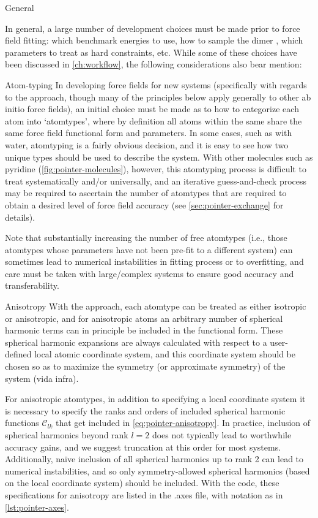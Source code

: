 \begin{subsection}{General}

In general, a large number of development choices must be made prior to force field
fitting: which benchmark energies to use, how to sample the dimer \pes, which
parameters to treat as hard constraints, etc. While some of these choices have
been discussed in \cref{ch:workflow}, the following considerations also bear
mention:

\begin{paragraph}{Atom-typing}
In developing force fields for new systems (specifically with regards to the \mastiff approach, though
many of the principles below apply generally to other ab initio force fields),
an initial choice must be made as to how to categorize each atom into 
`atomtypes', where by definition all atoms within the same \atomtype share the
same force field functional form and parameters. In some cases, such as with
water, atomtyping is a fairly obvious decision, and it is easy to see how two
unique types should be used to describe the system. With other molecules
such as pyridine (\cref{fig:pointer-molecules}), however, this
atomtyping process is difficult to treat systematically and/or universally, and an iterative
guess-and-check process may be required to ascertain the number of atomtypes
that are required to obtain a desired level of force field accuracy (see
\cref{sec:pointer-exchange} for details).

Note that substantially increasing the number of free atomtypes (i.e., those
atomtypes whose parameters have not been pre-fit to a different system) 
can sometimes lead to numerical instabilities in fitting process or to
overfitting,\cite{Hawkins2004} and care must be taken with large/complex
systems to ensure good accuracy and transferability. 
\end{paragraph}

\begin{paragraph}{Anisotropy}
With the \mastiff approach, each atomtype can be treated as either
isotropic or anisotropic, and for anisotropic atoms an arbitrary number of
spherical harmonic terms can in principle be included in the functional form. These spherical
harmonic expansions are always calculated with respect to a user-defined local
atomic coordinate system, and this coordinate system should be chosen so as to
maximize the symmetry (or approximate symmetry) of the system (vida infra).

For anisotropic atomtypes, in addition to specifying a local coordinate system
it is necessary to specify the ranks and orders of included spherical harmonic
functions $\mathcal{C}_{lk}$ that get included in
\cref{eq:pointer-anisotropy}. In practice, inclusion of spherical harmonics
beyond rank $l=2$ does not typically lead to worthwhile accuracy gains, and we
suggest truncation at this order for most systems.  Additionally, na\"ive
inclusion of all spherical harmonics up to rank 2 can lead to numerical
instabilities, and so only symmetry-allowed spherical harmonics (based on the
local coordinate system) should be included.  With the \pointer code, these
specifications for anisotropy are listed in the .axes file, with notation as
in \cref{lst:pointer-axes}. 


\end{paragraph}
\end{subsection}
